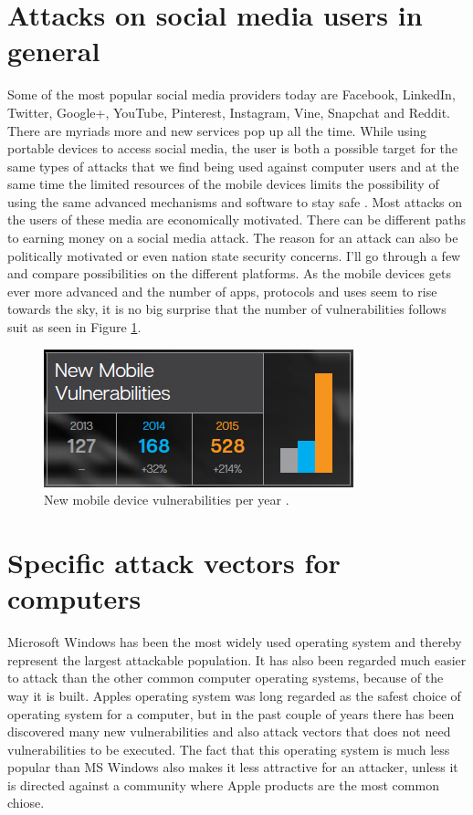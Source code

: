 \section{Attacks on social media users in general}
Some of the most popular social media providers today are Facebook, LinkedIn, Twitter, Google+, YouTube, Pinterest, Instagram, Vine, Snapchat and Reddit. There are myriads more and new services pop up all the time.
While using portable devices to access social media, the user is both a possible target for the same types of attacks that we find being used against computer users and at the same time the limited resources of the mobile devices limits the possibility of using the same advanced mechanisms and software to stay safe \cite{Zonouz2013215}.
Most attacks on the users of these media are economically motivated. There can be different paths to earning money on a social media attack. The reason for an attack can also be politically motivated or even nation state security concerns. I’ll go through a few and compare possibilities on the different platforms.
As the mobile devices gets ever more advanced and the number of apps, protocols and uses seem to rise towards the sky, it is no big surprise that the number of vulnerabilities follows suit as seen in Figure \ref{fig:mobile_vulnerabilities}.
\begin{figure}
\centering
\includegraphics[width=0.5 \textwidth]{fig/mobile_vulnerabilities}
\caption{New mobile device vulnerabilities per year \cite{ISTR2016}.\label{fig:mobile_vulnerabilities}}
\end{figure}
\section{Specific attack vectors for computers}
Microsoft Windows has been the most widely used operating system and thereby represent the largest attackable population. It has also been regarded much easier to attack than the other common computer operating systems, because of the way it is built. 
Apples operating system was long regarded as the safest choice of operating system for a computer, but in the past couple of years there has been discovered many new vulnerabilities and also attack vectors that does not need vulnerabilities to be executed. The fact that this operating system is much less popular than MS Windows also makes it less attractive for an attacker, unless it is directed against a community where Apple products are the most common chiose.
